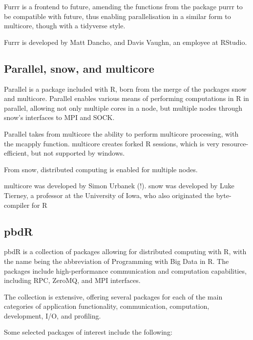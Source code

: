 \documentclass[a4paper,10pt]{article}
\begin{document}
Furrr is a frontend to future, amending the functions from the package
purrr to be compatible with future, thus enabling parallelisation in a
similar form to multicore, though with a tidyverse
style\cite{vaughan18}.

Furrr is developed by Matt Dancho, and Davis Vaughn, an employee at
RStudio.

\subsection{Parallel, snow, and multicore}
\label{sec:parall-snow-mult}
Parallel is a package included with R, born from the merge of the
packages snow and multicore\cite{core:_packag}. Parallel enables
various means of performing computations in R in parallel, allowing
not only multiple cores in a node, but multiple nodes through snow's
interfaces to MPI and SOCK\cite{tierney18}.

Parallel takes from multicore the ability to perform multicore
processing, with the mcapply function. multicore creates forked R
sessions, which is very resource-efficient, but not supported by
windows.

From snow, distributed computing is enabled for multiple nodes.

multicore was developed by Simon Urbanek (!). snow was developed by
Luke Tierney, a professor at the University of Iowa, who also
originated the byte-compiler for R

\subsection{pbdR}
\label{sec:pbdr}

pbdR is a collection of packages allowing for distributed computing
with R\cite{pbdBASEpackage}, with the name being the abbreviation of
Programming with Big Data in R. The packages include high-performance
communication and computation capabilities, including RPC, ZeroMQ, and
MPI interfaces.

The collection is extensive, offering several packages for each of the
main categories of application functionality, communication,
computation, development, I/O, and profiling.

Some selected packages of interest include the following:
\end{document}
